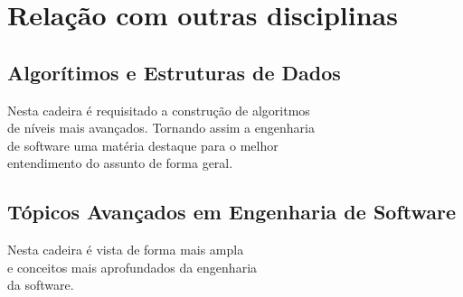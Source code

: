 \documentclass{article}
\begin{document}
\section{Relação com outras disciplinas}
    \subsection{Algorítimos e Estruturas de Dados}
    Nesta cadeira  é requisitado a construção de algoritmos\\ de níveis mais avançados. Tornando assim a engenharia\\ de software
        uma matéria destaque para o melhor\\ entendimento do assunto de forma geral. 
    \subsection{Tópicos Avançados em Engenharia de Software}
    Nesta cadeira  é vista 
       de forma mais ampla\\ e conceitos mais aprofundados da engenharia\\ da software.




\end{document}

